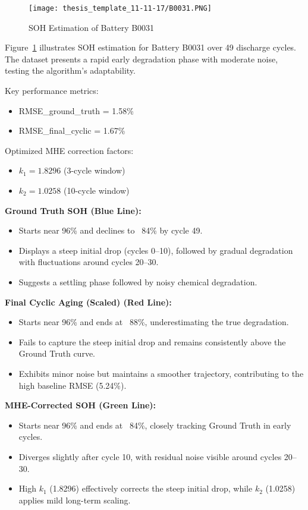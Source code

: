\begin{figure}
    \centering
    \texttt{[image: thesis\_template\_11-11-17/B0031.PNG]}
    \caption{SOH Estimation of Battery B0031}
    \label{fig:resB0031}
\end{figure}

Figure~\ref{fig:resB0031} illustrates SOH estimation for Battery B0031 over 49 discharge cycles. The dataset presents a rapid early degradation phase with moderate noise, testing the algorithm’s adaptability.

Key performance metrics:
\begin{itemize}
    \item RMSE\_ground\_truth = 1.58\%
    \item RMSE\_final\_cyclic = 1.67\%
\end{itemize}

Optimized MHE correction factors:
\begin{itemize}
    \item $k_1 = 1.8296$ (3-cycle window)
    \item $k_2 = 1.0258$ (10-cycle window)
\end{itemize}

\vspace{0.5em}
\textbf{Ground Truth SOH (Blue Line):}
\begin{itemize}
    \item Starts near 96\% and declines to ~84\% by cycle 49.
    \item Displays a steep initial drop (cycles 0--10), followed by gradual degradation with fluctuations around cycles 20--30.
    \item Suggests a settling phase followed by noisy chemical degradation.
\end{itemize}

\vspace{0.5em}
\textbf{Final Cyclic Aging (Scaled) (Red Line):}
\begin{itemize}
    \item Starts near 96\% and ends at ~88\%, underestimating the true degradation.
    \item Fails to capture the steep initial drop and remains consistently above the Ground Truth curve.
    \item Exhibits minor noise but maintains a smoother trajectory, contributing to the high baseline RMSE (5.24\%).
\end{itemize}

\vspace{0.5em}
\textbf{MHE-Corrected SOH (Green Line):}
\begin{itemize}
    \item Starts near 96\% and ends at ~84\%, closely tracking Ground Truth in early cycles.
    \item Diverges slightly after cycle 10, with residual noise visible around cycles 20--30.
    \item High $k_1$ (1.8296) effectively corrects the steep initial drop, while $k_2$ (1.0258) applies mild long-term scaling.
\end{itemize}

